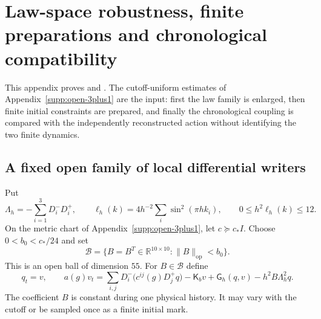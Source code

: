 \documentclass[11pt]{article}
\numberwithin{equation}{section}
\theoremstyle{definition}
\theoremstyle{remark}
\newcommand{\op}{\mathrm{op}}
\begin{document}
\section{Law-space robustness, finite preparations and chronological compatibility}
\label{supp:open-law-basin}

This appendix proves  and
. The cutoff-uniform estimates of
Appendix~\ref{supp:open-3plus1} are the input: first the law family is
enlarged, then finite initial constraints are prepared, and finally the
chronological coupling is compared with the independently reconstructed
action without identifying the two finite dynamics.

\subsection{A fixed open family of local differential writers}

Put
\begin{equation}
 \Lambda_h=-\sum_{i=1}^3D_i^-D_i^+,
 \qquad
 \ell_h(k)=4h^{-2}\sum_i\sin^2(\pi hk_i),
 \qquad0\le h^2\ell_h(k)\le12.
 \label{eq:supp-law-laplacian}
\end{equation}
On the metric chart of Appendix~\ref{supp:open-3plus1}, let
$c\succeq c_*I$.  Choose $0<b_0<c_*/24$ and set
\begin{equation}
 \mathcal B=\{B=B^T\in\mathbb R^{10\times10}:\|B\|_{\op}<b_0\}.
 \label{eq:supp-law-ball}
\end{equation}
This is an open ball of dimension $55$.  For $B\in\mathcal B$ define
\begin{equation}
 q_t=v,\qquad
 a(g)v_t=\sum_{i,j}D_i^-\!\bigl(c^{ij}(g)D_j^+q\bigr)
       -\mathsf K_bv+\mathsf G_h(q,v)-h^2B\Lambda_h^2q.
 \label{eq:supp-law-family}
\end{equation}
The coefficient $B$ is constant during one physical history.  It may vary
with the cutoff or be sampled once as a finite initial mark.
\end{document}
